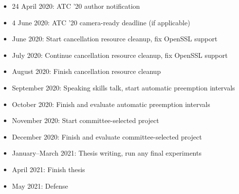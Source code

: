 \documentclass[12pt,letterpaper]{book}
\begin{document}
\begin{itemize}
\item 24 April 2020: ATC '20 author notification
\item 4 June 2020: ATC '20 camera-ready deadline (if applicable)
\item June 2020: Start cancellation resource cleanup, fix OpenSSL support
\item July 2020: Continue cancellation resource cleanup, fix OpenSSL support
\item August 2020: Finish cancellation resource cleanup
\item September 2020: Speaking skills talk, start automatic preemption intervals
\item October 2020: Finish and evaluate automatic preemption intervals
\item November 2020: Start committee-selected project
\item December 2020: Finish and evaluate committee-selected project
\item January--March 2021: Thesis writing, run any final experiments
\item April 2021: Finish thesis
\item May 2021: Defense
\end{itemize}


\cleardoublepage
{}

\end{document}
